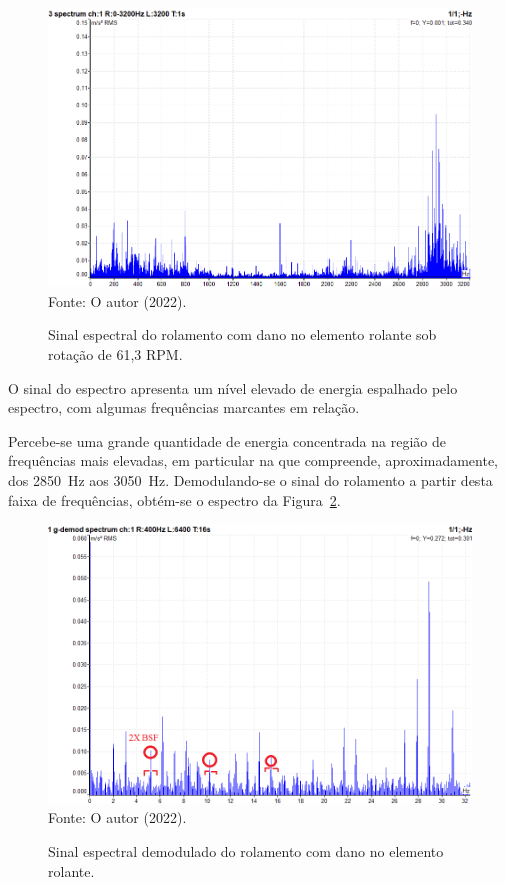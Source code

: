 \documentclass[
	12pt,				
	oneside,			
	a4paper,			
	english,			
	brazil,			
	]{abntex2ppgsi}
\begin{document}
\begin{figure}[H]
\centering
\caption {Sinal espectral do rolamento com dano no elemento rolante sob rotação de 61,3 RPM.}
\includegraphics[width=\textwidth,keepaspectratio]{ESPECTRO_ROLAMENTO_DEFEITO_ROLANTE_100HZ} \\
Fonte: O autor (2022).
\label{ESPECTRO_ROLAMENTO_DEFEITO_ROLANTE_100HZ}
\end{figure}

O sinal do espectro apresenta um nível elevado de energia espalhado pelo espectro, com algumas frequências marcantes em relação. 

Percebe-se uma grande quantidade de energia concentrada na região de frequências mais elevadas, em particular na que compreende, aproximadamente, dos \SI{2850}{\hertz} aos \SI{3050}{\hertz}. Demodulando-se o sinal do rolamento a partir desta faixa de frequências, obtém-se o espectro da Figura~\ref{2bsf_anotado}. 

\begin{figure}[H]
\centering
\caption {Sinal espectral demodulado do rolamento com dano no elemento rolante.}
\includegraphics[width=\textwidth,keepaspectratio]{2bsf_anotado} \\
Fonte: O autor (2022).
\label{2bsf_anotado}
\end{figure}
\end{document}
